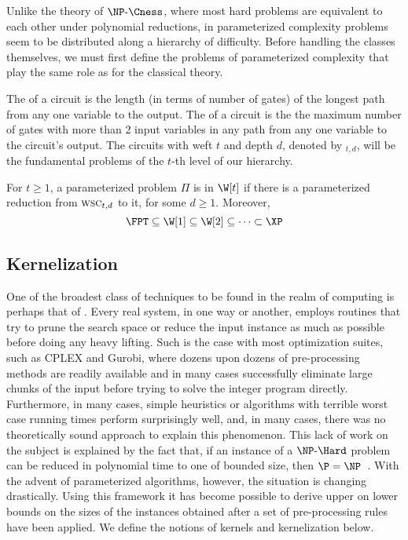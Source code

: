 Unlike the theory of $\NPcness$, where most hard problems are equivalent to each other under polynomial reductions, in parameterized complexity problems seem to be distributed along a hierarchy of difficulty.
Before handling the classes themselves, we must first define the problems of parameterized complexity that play the same role as  for the classical theory. 

The  of a circuit is the length (in terms of number of gates) of the longest path from any one variable to the output.
The  of a circuit is the the maximum number of gates with more than 2 input variables in any path from any one variable to the circuit's output.
The circuits with weft $t$ and depth $d$, denoted by $_{t,d}$, will be the fundamental problems of the $t$-th level of our hierarchy.


\begin{class_definition*}[$\W$-hierarchy]
    For $t \geq 1$, a parameterized problem $\Pi$ is in $\W[t]$ if there is a parameterized reduction from $\textsc{wsc}_{t,d}$ to it, for some $d \geq 1$. Moreover,
    \begin{equation*}
        \FPT \subseteq \W[1] \subseteq \W[2] \subseteq \cdots \subset \XP
    \end{equation*}
\end{class_definition*}


\subsection{Kernelization}

One of the broadest class of techniques to be found in the realm of computing is perhaps that of .
Every real system, in one way or another, employs routines that try to prune the search space or reduce the input instance as much as possible before doing any heavy lifting.
Such is the case with most optimization suites, such as CPLEX and Gurobi, where dozens upon dozens of pre-processing methods are readily available and in many cases successfully eliminate large chunks of the input before trying to solve the integer program directly.
Furthermore, in many cases, simple heuristics or algorithms with terrible worst case running times perform surprisingly well, and, in many cases, there was no theoretically sound approach to explain this phenomenon.
This lack of work on the subject is explained by the fact that, if an instance of a $\NPH$ problem can be reduced in polynomial time to one of bounded size, then $\P = \NP$~\citep{book-kernels}.
With the advent of parameterized algorithms, however, the situation is changing drastically.
Using this framework it has become possible to derive upper on lower bounds on the sizes of the instances obtained after a set of pre-processing rules have been applied.
We define the notions of kernels and kernelization below.

